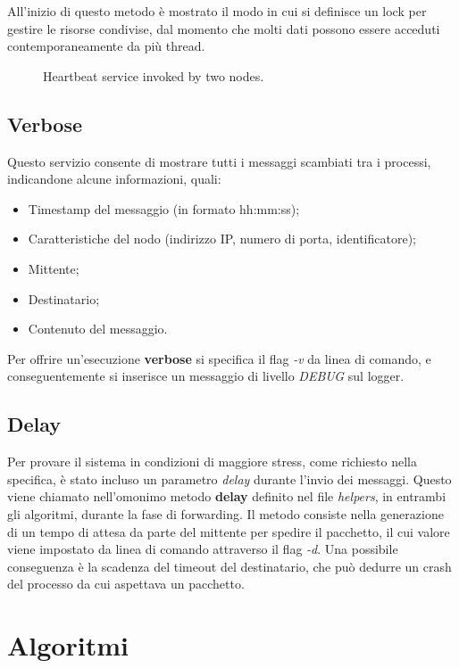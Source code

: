 \documentclass[conference]{IEEEtran}
\begin{document}
All'inizio di questo metodo è mostrato il modo in cui si definisce un lock per gestire le risorse condivise, dal momento che molti dati possono essere acceduti contemporaneamente da più thread.

\begin{figure}[htbp]
  \centering
  
  \caption{Heartbeat service invoked by two nodes.}
\end{figure}


\subsection{Verbose}\label{verbose}

Questo servizio consente di mostrare tutti i messaggi scambiati tra i processi, indicandone alcune informazioni, quali:
\begin{itemize}
	\item Timestamp del messaggio (in formato hh:mm:ss);
	\item Caratteristiche del nodo (indirizzo IP, numero di porta, identificatore);
	\item Mittente;
	\item Destinatario;
	\item Contenuto del messaggio.
\end{itemize}
Per offrire un'esecuzione \textbf{verbose} si specifica il flag \textit{-v} da linea di comando, e conseguentemente si inserisce un messaggio di livello \textit{DEBUG} sul logger.


\subsection{Delay}\label{delay}

Per provare il sistema in condizioni di maggiore stress, come richiesto nella specifica, è stato incluso un parametro \textit{delay} durante l'invio dei messaggi.
Questo viene chiamato nell'omonimo metodo \textbf{delay} definito nel file \textit{helpers}, in entrambi gli algoritmi, durante la fase di forwarding.
Il metodo consiste nella generazione di un tempo di attesa da parte del mittente per spedire il pacchetto, il cui valore viene impostato da linea di comando attraverso il flag \textit{-d}.
Una possibile conseguenza è la scadenza del timeout del destinatario, che può dedurre un crash del processo da cui aspettava un pacchetto.


\section{Algoritmi}\label{sec:algo}
\end{document}
